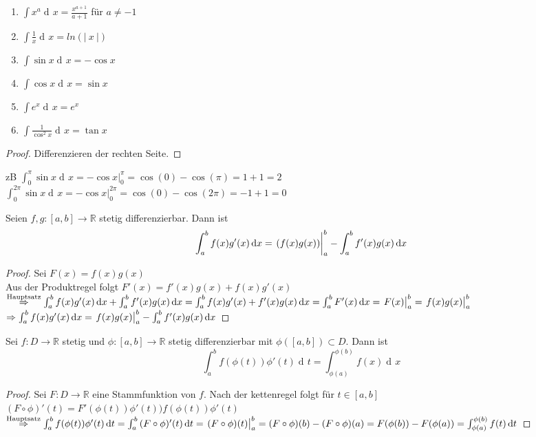 \documentclass[a4paper,titlepage,oneside]{article}
\def\R{\ensuremath{\mathbb{R}} }
\def\e{\ensuremath{\mathit{e}} }
\newcommand{\der}{\operatorname{d\!}{}}
\newcommand{\abs}[1]{\ensuremath{\left|\:#1\:\right|}}
\newcommand{\integral}[4][x]{\ensuremath{\int_{#2}^{#3}{#4\der #1}}}
\newcommand{\intAB}[2][x]{\integral[#1]{a}{b}{#2}}
\newcommand{\stamm}[3]{\ensuremath{\left.\vphantom{\frac{1}{n}}#3\right|_{#1}^{#2}}}
\theoremstyle{thmstyle}
\begin{document}
\begin{bsp}[zu Stammfunktionen]
\begin{enumerate}
\item $\displaystyle \int{x^a \der x} = \frac{x^{a+1}}{a+1} $ für $ a \ne -1$
\item $\displaystyle \int{\frac{1}{x} \der x} = ln(\abs{x})$
\item $\displaystyle \int{\sin x \der x} = - \cos x$
\item $\displaystyle \int{\cos x \der x} = \sin x$
\item $\displaystyle \int{\e^x \der x} =  \e^x$
\item $\displaystyle \int{\frac{1}{\cos^2x} \der x} =  \tan x$
\end{enumerate}
\begin{proof}
Differenzieren der rechten Seite.
\end{proof}
zB $\int_{0}^{\pi}{\sin x \der x} = - \cos x  |_0^{\pi} = \cos(0) - \cos(\pi) = 1 +1 = 2$\\
$\int_{0}^{2\pi}{\sin x \der x} = - \cos x  |_0^{2\pi} = \cos(0) - \cos(2\pi) = -1 +1 = 0$
\end{bsp}

\begin{satz}
Seien $f,g : [a,b] \to \R$ stetig differenzierbar. Dann ist \[\intAB{f(x)g'(x)} = \stamm{a}{b}{(f(x) g(x))} - \intAB{f'(x)g(x)}\]
\begin{proof}
Sei $F(x) = f(x)g(x)$\\
Aus der Produktregel folgt $F'(x) = f'(x) g(x) + f(x) g'(x)$\\
$\overset{\text{Hauptsatz}}{\Rightarrow} \intAB{f(x)g'(x)} + \intAB{f'(x)g(x)} = \intAB{f(x)g'(x) + f'(x)g(x)} = \intAB{F'(x)} = \stamm{a}{b}{F(x)} = \stamm{a}{b}{f(x)g(x)} $\\
$\Rightarrow \intAB{f(x)g'(x)} = \stamm{a}{b}{f(x)g(x)} - \intAB{f'(x)g(x)} $
\end{proof}
\end{satz}

\begin{satz}[Substitutionsregel]
Sei $f : D \to \R$ stetig und $\phi: [a,b] \to \R$ stetig differenzierbar mit $\phi([a,b]) \subset D$. Dann ist \[ \int_{a}^{b}{f(\phi(t))\phi'(t) \der t} = \integral{\phi(a)}{\phi(b)}{f(x)}\]
\begin{proof}
Sei $F: D \to \R$ eine Stammfunktion von $f$. Nach der kettenregel folgt für $t \in [a,b]$ \\
$\displaystyle (F \circ \phi)'(t) = F'(\phi(t))\phi'(t) ) f(\phi(t))\phi'(t)$\\
$\overset{\text{Hauptsatz}}{\Rightarrow} \intAB[t]{f(\phi(t))\phi'(t)} = \intAB[t]{(F\circ\phi)'(t)} = \stamm{a}{b}{(F\circ\phi)(t)} = (F\circ\phi)(b) - (F\circ\phi)(a) = F(\phi(b)) - F(\phi(a)) = \integral[t]{\phi(a)}{\phi(b)}{f(t)}$
\end{proof}
\end{satz}
\end{document}
